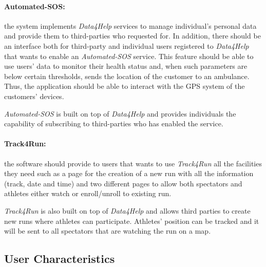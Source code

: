 \documentclass[a4paper]{article}
\begin{document}
    \paragraph{Automated-SOS:} the system implements \textit{Data4Help} services to manage individual's personal data and provide them to third-parties who requested for. In addition, there should be an interface both for third-party and individual users registered to \textit{Data4Help} that wants to enable an \textit{Automated-SOS} service. This feature should be able to use users' data to monitor their health status and, when such parameters are below certain thresholds, sends the location of the customer to an ambulance. Thus, the application should be able to interact with the GPS system of the customers' devices.
    
    \textit{Automated-SOS} is built on top of \textit{Data4Help} and provides individuals the capability of subscribing to third-parties who has enabled the service.
    
    \paragraph{Track4Run: } the software should provide to users that wants to use \textit{Track4Run} all the facilities they need such as a page for the creation of a new run with all the information (track, date and time) and two different pages to allow both spectators and athletes either watch or enroll/unroll to existing run.
    
    \textit{Track4Run} is also built on top of \textit{Data4Help} and allows third parties to create new runs where athletes can participate. Athletes' position can be tracked and it will be sent to all spectators that are watching the run on a map.
    
    \subsection{User Characteristics}
\end{document}
